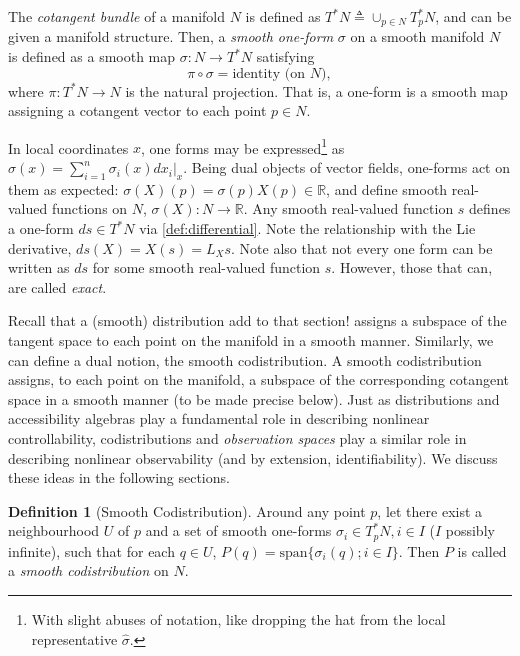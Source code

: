 \documentclass[psamsfonts]{amsart}
\theoremstyle{definition}
\newtheorem{defn}[thm]{Definition}
\theoremstyle{remark}
\newcommand*\R{\mathds{R}}
\newcommand*\isdefined{\triangleq}
\numberwithin{equation}{section}
\begin{document}
The \textit{cotangent bundle} of a manifold $N$ is defined as $T^*N \isdefined \cup_{p\in N}T_p^*N$, and can be given a manifold structure. Then, a \textit{smooth one-form} $\sigma$ on a smooth manifold $N$ is defined as a smooth map $\sigma : N \rightarrow T^*N$ satisfying $$\pi \circ \sigma = \text{identity (on } N),$$ where $\pi: T^*N \rightarrow N$ is the natural projection. That is, a one-form is a smooth map assigning a cotangent vector to each point $p\in N$.

In local coordinates $x$, one forms may be expressed\footnote{With slight abuses of notation, like dropping the hat from the local representative $\hat \sigma$.} as $\sigma(x) = \sum_{i=1}^n \sigma_i(x)dx_i\vert_{x}$. Being dual objects of vector fields, one-forms act on them as expected: $\sigma(X)(p) = \sigma(p)X(p) \in \R$, and define smooth real-valued functions on $N$, $\sigma(X) : N \rightarrow \R$. Any smooth real-valued function $s$ defines a one-form $ds\in T^*N$ via \eqref{def:differential}. Note the relationship with the Lie derivative, $ds(X) = X(s) = L_Xs$. Note also that not every one form can be written as $ds$ for some smooth real-valued function $s$. However, those that can, are called \textit{exact}. 


Recall that a (smooth) distribution {\color{red}add to that section!} assigns a subspace of the tangent space to each point on the manifold in a smooth manner. Similarly, we can define a dual notion, the smooth codistribution. A smooth codistribution assigns, to each point on the manifold, a subspace of the corresponding cotangent space in a smooth manner (to be made precise below). Just as distributions and accessibility algebras play a fundamental role in describing nonlinear controllability, codistributions and \textit{observation spaces} play a similar role in describing nonlinear observability (and by extension, identifiability). We discuss these ideas in the following sections. 

\begin{defn}[Smooth Codistribution]
Around any point $p$, let there exist a neighbourhood $U$ of $p$ and a set of smooth one-forms $\sigma_i \in T^*_pN, i\in I$ ($I$ possibly infinite), such that for each $q \in U$, $P(q) = \text{span}\{\sigma_i(q); i \in I\}$. Then $P$ is called a \textit{smooth codistribution }on $N$. 
\end{defn}
\end{document}
